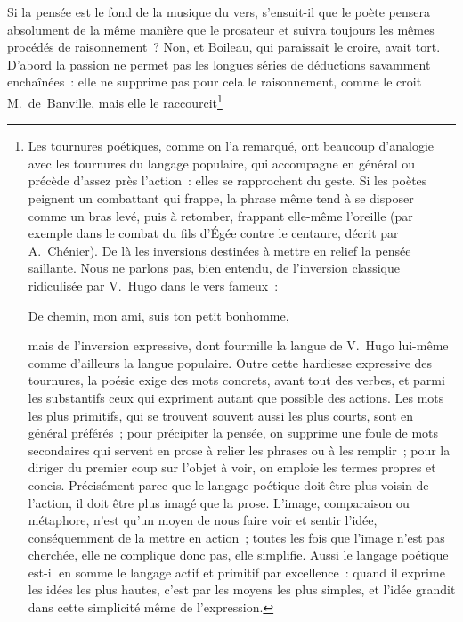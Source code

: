 \documentclass[french,twoside]{book} %
\begin{document}
Si la pensée est le fond de la musique du vers, s’ensuit-il que le poète pensera absolument de la même manière que le prosateur et suivra toujours les mêmes procédés de raisonnement ? Non, et Boileau, qui paraissait le croire, avait tort. D’abord la passion ne permet pas les longues séries de déductions savamment enchaînées : elle ne supprime pas pour cela le raisonnement, comme le croit M. de Banville, mais elle le raccourcit\footnote{\noindent Les tournures poétiques, comme on l’a remarqué, ont beaucoup d’analogie avec les tournures du langage populaire, qui accompagne en général ou précède d’assez près l’action : elles se rapprochent du geste. Si les poètes peignent un combattant qui frappe, la phrase même tend à se disposer comme un bras levé, puis à retomber, frappant elle-même l’oreille (par exemple dans le combat du fils d’Égée contre le centaure, décrit par A. Chénier). De là les inversions destinées à mettre en relief la pensée saillante. Nous ne parlons pas, bien entendu, de l’inversion classique ridiculisée par V. Hugo dans le vers fameux :\par
De chemin, mon ami, suis ton petit bonhomme,\\
\par
\noindent mais de l’inversion expressive, dont fourmille la langue de V. Hugo lui-même comme d’ailleurs la langue populaire. Outre cette hardiesse expressive des tournures, la poésie exige des mots concrets, avant tout des verbes, et parmi les substantifs ceux qui expriment autant que possible des actions. Les mots les plus primitifs, qui se trouvent souvent aussi les plus courts, sont en général préférés ; pour précipiter la pensée, on supprime une foule de mots secondaires qui servent en prose à relier les phrases ou à les remplir ; pour la diriger du premier coup sur l’objet à voir, on emploie les termes propres et concis. Précisément parce que le langage poétique doit être plus voisin de l’action, il doit être plus imagé que la prose. L’image, comparaison ou métaphore, n’est qu’un moyen de nous faire voir et sentir l’idée, conséquemment de la mettre en action ; toutes les fois que l’image n’est pas cherchée, elle ne complique donc pas, elle simplifie. Aussi le langage poétique est-il en somme le langage actif et primitif par excellence : quand il exprime les idées les plus hautes, c’est par les moyens les plus simples, et l’idée grandit dans cette simplicité même de l’expression.
}
\end{document}
